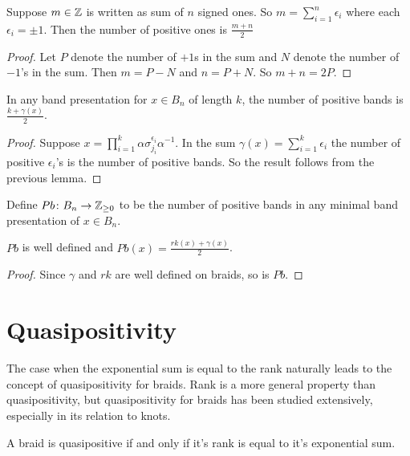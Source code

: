 \documentclass[12pt]{thesis}
\begin{document}
\begin{lemma}
    Suppose $m \in \mathbb{Z}$ is written
    as sum of $n$ signed ones.
    So $m = \sum_{i=1}^{n} \epsilon_{i}$ where each $\epsilon_{i} = \pm 1$.
    Then the number of positive ones is $\frac{m + n}{2}$
\end{lemma}

\begin{proof}
    Let $P$ denote the number of $+1$s in the sum
    and $N$ denote the number of $-1$'s in the sum.
    Then $m = P - N$ and $n = P + N$.
    So $m + n = 2P$.
\end{proof}

\begin{proposition}
    \label{prop:positive-negative-bands}
    In any band presentation for $x \in B_{n}$ of length $k$,
    the number of positive bands
    is $\frac{k + \gamma(x)}{2}$.
\end{proposition}

\begin{proof}
    Suppose $x = \prod_{i = 1}^{k} \alpha\sigma_{j_{i}}^{\epsilon_{i}}\alpha^{-1}$.
    In the sum $\gamma(x) = \sum_{i=1}^{k} \epsilon_{i}$
    the number of positive $\epsilon_{i}$'s is the number of positive bands.
    So the result follows from the previous lemma.
\end{proof}

Define $Pb \colon B_{n} \rightarrow \mathbb{Z}_{\geq 0}$ 
to be the number of positive bands
in any minimal band presentation of $x \in B_{n}$.
\begin{corollary}
   $Pb$ is well defined and $Pb(x) = \frac{rk(x) + \gamma(x)}{2}$.
\end{corollary}

\begin{proof}
    Since $\gamma$ and $rk$ are well defined on braids, so is $Pb$.
\end{proof}

\section{Quasipositivity}

The case when the exponential sum is equal to the rank 
naturally leads to the concept of quasipositivity for braids.
Rank is a more general property than quasipositivity, but quasipositivity
for braids has been studied extensively, especially in its relation to knots.

\begin{proposition}
    \label{quasipositive-from-rank}
    A braid is quasipositive if and only if it's rank is equal to it's exponential sum.
\end{proposition}
\end{document}
